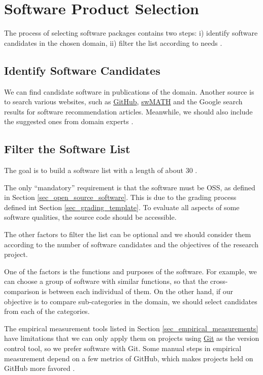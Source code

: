 \section{Software Product Selection}
\label{sec_software_selection}

The process of selecting software packages contains two steps: i) identify software candidates in the chosen domain, ii) filter the list according to needs \cite{SmithEtAl2021}.

\subsection{Identify Software Candidates}
\label{sec_identify_software_candidates}
We can find candidate software in publications of the domain. Another source is to search various websites, such as \hyperlink{https://github.com/}{GitHub}, \hyperlink{https://swmath.org/}{swMATH} and the Google search results for software recommendation articles. Meanwhile, we should also include the suggested ones from domain experts \cite{SmithEtAl2021}.

\subsection{Filter the Software List}
\label{sec_filter_software_list}
The goal is to build a software list with a length of about 30 \cite{SmithEtAl2021}.

The only ``mandatory'' requirement is that the software must be OSS, as defined in Section \ref{sec_open_source_software}. This is due to the grading process defined int Section \ref{sec_grading_template}. To evaluate all aspects of some software qualities, the source code should be accessible. 

The other factors to filter the list can be optional and we should consider them according to the number of software candidates and the objectives of the research project.

One of the factors is the functions and purposes of the software. For example, we can choose a group of software with similar functions, so that the cross-comparison is between each individual of them. On the other hand, if our objective is to compare sub-categories in the domain, we should select candidates from each of the categories.

The empirical measurement tools listed in Section \ref{sec_empirical_measurements} have limitations that we can only apply them on projects using \hyperlink{https://git-scm.com/}{Git} as the version control tool, so we prefer software with Git. Some manual steps in empirical measurement depend on a few metrics of GitHub, which makes projects held on GitHub more favored \cite{SmithEtAl2021}.

